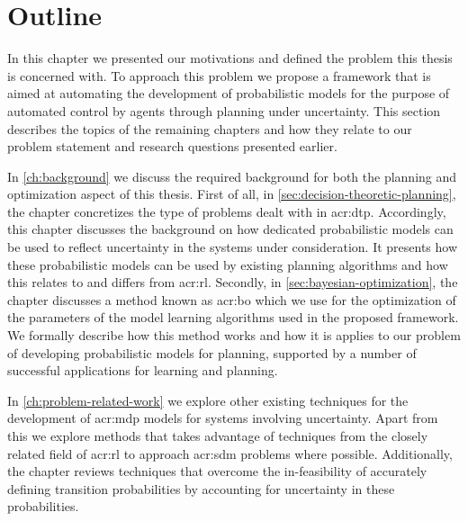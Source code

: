 \section{Outline}
\label{sec:introduction-outline}

In this chapter we presented our motivations and defined the problem this thesis is concerned with.
To approach this problem we propose a framework that is aimed at automating the development of probabilistic models for the purpose of automated control by agents through planning under uncertainty.
This section describes the topics of the remaining chapters and how they relate to our problem statement and research questions presented earlier. %

In \autoref{ch:background} we discuss the required background for both the planning and optimization aspect of this thesis.
First of all, in \autoref{sec:decision-theoretic-planning}, the chapter concretizes the type of problems dealt with in \acrshort{acr:dtp}. 
Accordingly, this chapter discusses the background on how dedicated probabilistic models can be used to reflect uncertainty in the systems under consideration.
It presents how these probabilistic models can be used by existing planning algorithms and how this relates to and differs from  \acrlong{acr:rl}.
Secondly, in \autoref{sec:bayesian-optimization}, the chapter discusses a method known as \acrlong{acr:bo} which we use for the optimization of the parameters of the model learning algorithms used in the proposed framework.
We formally describe how this method works and how it is applies to our problem of developing probabilistic models for planning, supported by a number of successful applications for learning and planning.

In \autoref{ch:problem-related-work} we explore other existing techniques for the development of \acrshort{acr:mdp} models for systems involving uncertainty.
Apart from this we explore methods that takes advantage of techniques from the closely related field of \acrshort{acr:rl} to approach \acrshort{acr:sdm} problems where possible.
Additionally, the chapter reviews techniques that overcome the in-feasibility of accurately defining transition probabilities by accounting for uncertainty in these probabilities.

